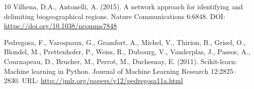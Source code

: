 \documentclass[11pt,a4paper]{article}
\begin{document}
\begin{thebibliography}{10}
Vilhena, D.A., Antonelli, A. (2015). A network approach for identifying
and delimiting biogeographical regions. Nature Communications 6:6848.
DOI: \url{https://doi.org/10.1038/ncomms7848}

Pedregosa, F., Varoquaux, G., Gramfort, A., Michel, V., Thirion, B., Grisel, O., Blondel, M., Prettenhofer, P., Weiss, R., Dubourg, V., Vanderplas, J., Passos, A., Cournapeau, D., Brucher, M., Perrot, M., Duchesnay, E. (2011). Scikit-learn: Machine learning in Python. Journal of Machine Learning Research 12:2825--2830. URL: \url{http://jmlr.org/papers/v12/pedregosa11a.html}

\end{thebibliography}
\end{document}
